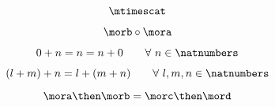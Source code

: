 {\begin{forslides}
 \begin{equation}\label{eq:42}
  \mtimescat
 \end{equation}
 
 \begin{equation}\label{eq:43}
  \morb \circ \mora
 \end{equation}
 
   \begin{equation}\label{eq:44}
  0 + n = n = n + 0   \quad \quad \forall \ n \in \natnumbers
 \end{equation}
 
 \begin{equation}\label{eq:45}
  (l + m) + n = l + (m + n) \quad \quad  \forall \ l, m, n \in \natnumbers
 \end{equation}
 
 \begin{equation}\label{eq:46}
  \mora \then \morb = \morc \then \mord
 \end{equation}

  \end{forslides}}